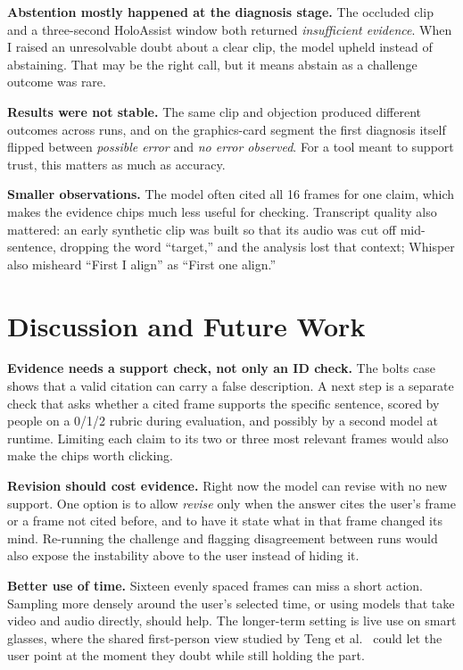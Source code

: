 \documentclass[sigconf]{acmart}
\begin{document}
\textbf{Abstention mostly happened at the diagnosis stage.} The occluded clip and a three-second HoloAssist window both returned \emph{insufficient evidence}. When I raised an unresolvable doubt about a clear clip, the model upheld instead of abstaining. That may be the right call, but it means abstain as a challenge outcome was rare.

\textbf{Results were not stable.} The same clip and objection produced different outcomes across runs, and on the graphics-card segment the first diagnosis itself flipped between \emph{possible error} and \emph{no error observed}. For a tool meant to support trust, this matters as much as accuracy.

\textbf{Smaller observations.} The model often cited all 16 frames for one claim, which makes the evidence chips much less useful for checking. Transcript quality also mattered: an early synthetic clip was built so that its audio was cut off mid-sentence, dropping the word ``target,'' and the analysis lost that context; Whisper also misheard ``First I align'' as ``First one align.''

\section{Discussion and Future Work}

\textbf{Evidence needs a support check, not only an ID check.} The bolts case shows that a valid citation can carry a false description. A next step is a separate check that asks whether a cited frame supports the specific sentence, scored by people on a 0/1/2 rubric during evaluation, and possibly by a second model at runtime. Limiting each claim to its two or three most relevant frames would also make the chips worth clicking.

\textbf{Revision should cost evidence.} Right now the model can revise with no new support. One option is to allow \emph{revise} only when the answer cites the user's frame or a frame not cited before, and to have it state what in that frame changed its mind. Re-running the challenge and flagging disagreement between runs would also expose the instability above to the user instead of hiding it.

\textbf{Better use of time.} Sixteen evenly spaced frames can miss a short action. Sampling more densely around the user's selected time, or using models that take video and audio directly, should help. The longer-term setting is live use on smart glasses, where the shared first-person view studied by Teng et al.~\cite{teng2026seeing} could let the user point at the moment they doubt while still holding the part.
\end{document}
